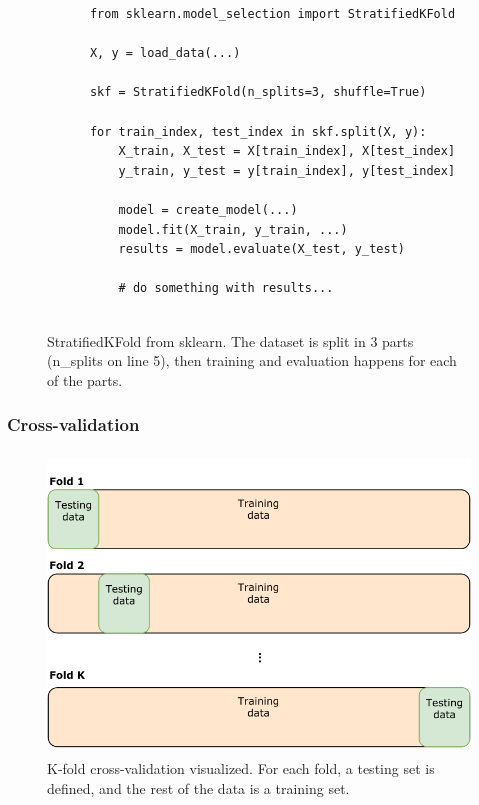 \begin{figure}[h]
  \begin{code}    
      \begin{verbatim}
      from sklearn.model_selection import StratifiedKFold
  
      X, y = load_data(...)
  
      skf = StratifiedKFold(n_splits=3, shuffle=True)
  
      for train_index, test_index in skf.split(X, y):
          X_train, X_test = X[train_index], X[test_index]
          y_train, y_test = y[train_index], y[test_index]
  
          model = create_model(...)
          model.fit(X_train, y_train, ...)
          results = model.evaluate(X_test, y_test)
  
          # do something with results...
  
      \end{verbatim}
      \caption{StratifiedKFold from sklearn. The dataset is split in 3 parts (n\_splits on line 5), then training and evaluation happens for each of the parts.}
      \label{code:sklearn_k_fold}
  \end{code}
\end{figure}
  

\subsubsection{Cross-validation}
\begin{figure}[!ht]
  \begin{center}
    \includegraphics[height=8cm]{img/Cross-validation.pdf}
    \caption{K-fold cross-validation visualized. For each fold, a testing set is defined, and the rest of the data is a training set.}
    \label{figure:dataset_cross_val}
  \end{center}  
\end{figure}

